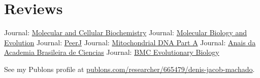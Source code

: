 
\section{Reviews}
	    {Journal: \href{https://www.springer.com/journal/11010/?gclid=Cj0KCQjwoJX8BRCZARIsAEWBFMLKBYnPcerYvwBvi0o_0fPoNuCnGz_5XU9lYKC91oSA7LozsZKev0saAuNLEALw_wcB}{Molecular and Cellular Biochemistry}}
	\cvline{---}
		{Journal: \href{https://academic.oup.com/mbe}{Molecular Biology and Evolution}}
	\cvline{---}
		{Journal: \href{https://peerj.com/}{PeerJ}}
	\cvline{---}
		{Journal: \href{https://www.tandfonline.com/loi/imdn20}{Mitochondrial DNA Part A}}
	    {Journal: \href{https://www.scielo.br/scielo.php?script=sci_serial&pid=0001-3765&lng=en&nrm=iso}{Anais da Academia Brasileira de Ciencias}}
	\cvline{---}
		{Journal: \href{https://bmcevolbiol.biomedcentral.com/}{BMC Evolutionary Biology}}

\vspace{0.5em}

See my Publons profile at \href{https://publons.com/researcher/665479/denis-jacob-machado/}{publons.com/researcher/665479/denis-jacob-machado}.
